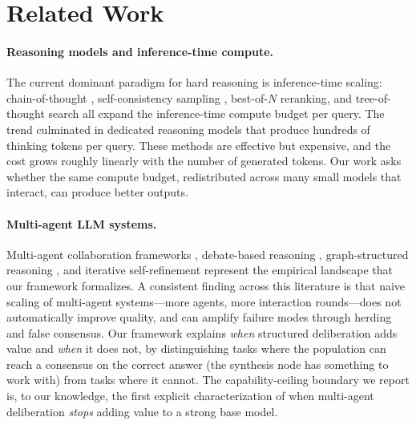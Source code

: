 \documentclass[11pt]{amsart}
\newcommand\1{{\mathds{1}}}
\theoremstyle{definition}
\theoremstyle{remark}
\numberwithin{equation}{section}
\begin{document}
\section{Related Work}\label{sec:related}

\paragraph{Reasoning models and inference-time compute.}
The current dominant paradigm for hard reasoning is inference-time scaling: chain-of-thought \cite{Wei2022CoT}, self-consistency sampling \cite{Wang2023SelfConsistency}, best-of-$N$ reranking, and tree-of-thought search \cite{Yao2023ToT} all expand the inference-time compute budget per query.
The trend culminated in dedicated reasoning models that produce hundreds of thinking tokens per query.
These methods are effective but expensive, and the cost grows roughly linearly with the number of generated tokens.
Our work asks whether the same compute budget, redistributed across many small models that interact, can produce better outputs.

\paragraph{Multi-agent LLM systems.}
Multi-agent collaboration frameworks \cite{Wu2023AutoGen, Hong2024MetaGPT, Li2023CAMEL, Qian2024ChatDev}, debate-based reasoning \cite{Irving2018Debate, Du2023Debate, Khan2024Debate}, graph-structured reasoning \cite{Yao2023ToT, Besta2024GoT}, and iterative self-refinement \cite{Shinn2023Reflexion, Madaan2023SelfRefine} represent the empirical landscape that our framework formalizes.
A consistent finding across this literature is that naive scaling of multi-agent systems---more agents, more interaction rounds---does not automatically improve quality, and can amplify failure modes through herding and false consensus.
Our framework explains \emph{when} structured deliberation adds value and \emph{when} it does not, by distinguishing tasks where the population can reach a consensus on the correct answer (the synthesis node has something to work with) from tasks where it cannot.
The capability-ceiling boundary we report is, to our knowledge, the first explicit characterization of when multi-agent deliberation \emph{stops} adding value to a strong base model.
\end{document}
